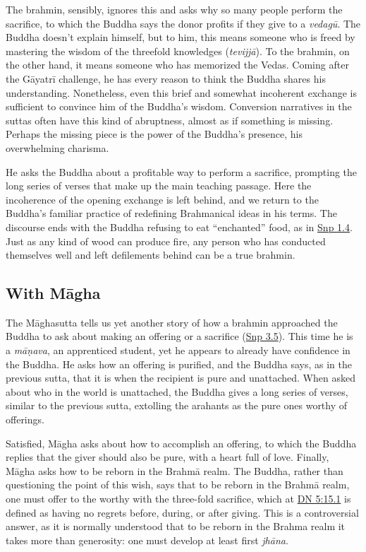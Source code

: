 \documentclass[12pt,openany]{book}%
\begin{document}
The brahmin, sensibly, ignores this and asks why so many people perform the sacrifice, to which the Buddha says the donor profits if they give to a \textit{\textsanskrit{vedagū}}. The Buddha doesn’t explain himself, but to him, this means someone who is freed by mastering the wisdom of the threefold knowledges (\textit{\textsanskrit{tevijjā}}). To the brahmin, on the other hand, it means someone who has memorized the Vedas. Coming after the \textsanskrit{Gāyatrī} challenge, he has every reason to think the Buddha shares his understanding. Nonetheless, even this brief and somewhat incoherent exchange is sufficient to convince him of the Buddha’s wisdom. Conversion narratives in the suttas often have this kind of abruptness, almost as if something is missing. Perhaps the missing piece is the power of the Buddha’s presence, his overwhelming charisma.

He asks the Buddha about a profitable way to perform a sacrifice, prompting the long series of verses that make up the main teaching passage. Here the incoherence of the opening exchange is left behind, and we return to the Buddha’s familiar practice of redefining Brahmanical ideas in his terms. The discourse ends with the Buddha refusing to eat “enchanted” food, as in \href{https://suttacentral.net/snp1.4/en/sujato}{Snp 1.4}. Just as any kind of wood can produce fire, any person who has conducted themselves well and left defilements behind can be a true brahmin.

\subsection*{With \textsanskrit{Māgha}}

The \textsanskrit{Māghasutta} tells us yet another story of how a brahmin approached the Buddha to ask about making an offering or a sacrifice (\href{https://suttacentral.net/snp3.5/en/sujato}{Snp 3.5}). This time he is a \textit{\textsanskrit{māṇava}}, an apprenticed student, yet he appears to already have confidence in the Buddha. He asks how an offering is purified, and the Buddha says, as in the previous sutta, that it is when the recipient is pure and unattached. When asked about who in the world is unattached, the Buddha gives a long series of verses, similar to the previous sutta, extolling the arahants as the pure ones worthy of offerings.

Satisfied, \textsanskrit{Māgha} asks about how to accomplish an offering, to which the Buddha replies that the giver should also be pure, with a heart full of love. Finally, \textsanskrit{Māgha} asks how to be reborn in the \textsanskrit{Brahmā} realm. The Buddha, rather than questioning the point of this wish, says that to be reborn in the \textsanskrit{Brahmā} realm, one must offer to the worthy with the three-fold sacrifice, which at \href{https://suttacentral.net/dn5/en/sujato\#15.1}{DN 5:15.1} is defined as having no regrets before, during, or after giving. This is a controversial answer, as it is normally understood that to be reborn in the Brahma realm it takes more than generosity: one must develop at least first \textit{\textsanskrit{jhāna}}.
\end{document}

